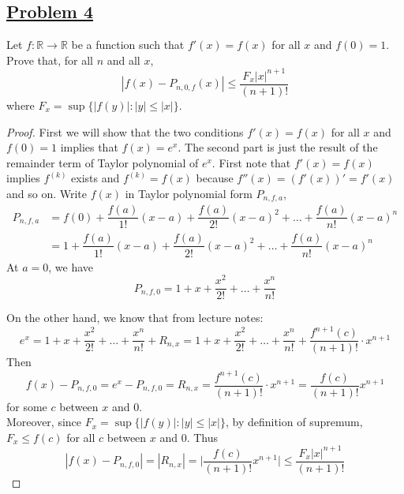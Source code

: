 \documentclass[10pt,letterpaper]{article}
\begin{document}
	\subsection*{{\color{purple}\underline{Problem 4}}}
	Let $f: \mathbb{R} \rightarrow \mathbb{R}$ be a function such that $f'(x) = f(x)$ for all $x$
	and $f(0) = 1$. Prove that, for all $n$ and all $x$, 
	$$|f(x) - P_{n,0,f}(x)| \leq \dfrac{F_x|x|^{n+1}}{(n + 1)!}$$
	where $F_x = \sup\{|f(y)| : |y| \leq |x|\}$.
	\begin{proof}
	First we will show that the two conditions $f'(x) = f(x)$ for all $x$ and $f(0) = 1$ implies that
	$f(x) = e^x$. The second part is just the result of the remainder term of Taylor polynomial of $e^x$.
	First note that $f'(x) = f(x)$ implies $f^{(k)}$ exists and $f^{(k)} = f(x)$ because $f''(x) = (f'(x))' = f'(x)$ and so on.
	Write $f(x)$ in Taylor polynomial form $P_{n,f,a}$,
	\begin{align*}
	P_{n,f,a} 
&= f(0) + \dfrac{f(a)}{1!}(x - a) + \dfrac{f(a)}{2!}(x - a)^2 + \ldots + \dfrac{f(a)}{n!}(x - a)^n \\ 
&= 1 + \dfrac{f(a)}{1!}(x - a) + \dfrac{f(a)}{2!}(x - a)^2 + \ldots + \dfrac{f(a)}{n!}(x - a)^n 
	\end{align*}	 
	At $a = 0$, we have
		$$P_{n,f,0} = 1 + x + \dfrac{x^2}{2!} + \ldots + \dfrac{x^n}{n!} $$ 
	
	On the other hand, we know that from lecture notes:
	$$e^x = 1 + x + \dfrac{x^2}{2!} + \ldots + \dfrac{x^n}{n!} + R_{n,x} = 1 + x + \dfrac{x^2}{2!} + \ldots + \dfrac{x^n}{n!} + \dfrac{f^{n+1}(c)}{(n + 1)!} \cdot x^{n+1}$$
	Then
	$$f(x) - P_{n,f,0} = e^x - P_{n,f,0} = R_{n,x} = \dfrac{f^{n+1}(c)}{(n + 1)!} \cdot x^{n+1} = \dfrac{f(c)}{(n + 1)!} x^{n+1}$$
	for some $c$ between $x$ and $0$. \\
	Moreover, since  $F_x = \sup\{|f(y)| : |y| \leq |x|\}$, by definition of supremum, $F_x \leq f(c)$ for all $c$ between $x$ and $0$. Thus
	$$|f(x) - P_{n,f,0}| = |R_{n,x}| = \bigg|\dfrac{f(c)}{(n + 1)!} x^{n+1}\bigg| \leq \dfrac{F_x|x|^{n+1}}{(n + 1)!}$$
	\end{proof}
	
\end{document}
